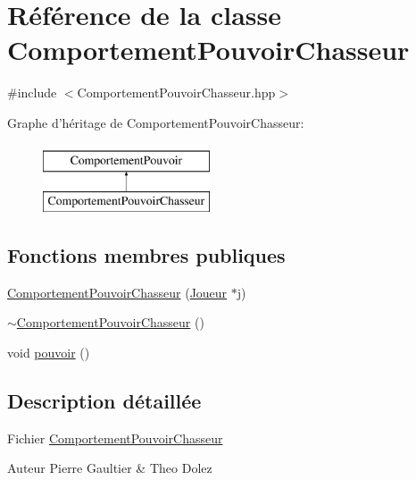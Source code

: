 \hypertarget{class_comportement_pouvoir_chasseur}{\section{\-Référence de la classe \-Comportement\-Pouvoir\-Chasseur}
\label{class_comportement_pouvoir_chasseur}
}


{\ttfamily \#include $<$\-Comportement\-Pouvoir\-Chasseur.\-hpp$>$}

\-Graphe d'héritage de \-Comportement\-Pouvoir\-Chasseur\-:\begin{figure}[H]
\begin{center}
\leavevmode
\includegraphics[height=2.000000cm]{class_comportement_pouvoir_chasseur}
\end{center}
\end{figure}
\subsection*{\-Fonctions membres publiques}
\begin{DoxyCompactItemize}
\item 
\hyperlink{class_comportement_pouvoir_chasseur_a051c87d077549a7edb5eb1e8c9944aff}{\-Comportement\-Pouvoir\-Chasseur} (\hyperlink{class_joueur}{\-Joueur} $\ast$j)
\item 
\hyperlink{class_comportement_pouvoir_chasseur_aaad834dea06fd69007e220d611927091}{$\sim$\-Comportement\-Pouvoir\-Chasseur} ()
\item 
void \hyperlink{class_comportement_pouvoir_chasseur_a334058c088f33d706f636cadd97150da}{pouvoir} ()
\end{DoxyCompactItemize}


\subsection{\-Description détaillée}
\-Fichier \hyperlink{class_comportement_pouvoir_chasseur}{\-Comportement\-Pouvoir\-Chasseur} \begin{DoxyAuthor}{\-Auteur}
\-Pierre \-Gaultier \& \-Theo \-Dolez 
\end{DoxyAuthor}


